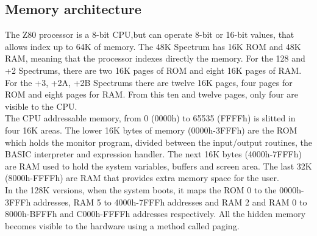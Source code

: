 \subsection{Memory architecture}
The Z80 processor is a 8-bit CPU,but can operate 8-bit or 16-bit values, that allows index up to 64K of memory. The 48K Spectrum has 16K ROM and 48K RAM, meaning that the processor indexes directly  the memory. For the 128 and +2 Spectrums, there are two 16K pages of ROM and eight 16K pages of RAM. For the +3, +2A, +2B Spectrums there are twelve 16K pages, four pages for ROM and eight pages for RAM. From this ten and twelve pages, only four are visible to the CPU.\\
\indent The CPU addressable memory, from 0 (0000h) to 65535 (FFFFh) is slitted in four 16K areas. The lower 16K bytes of memory (0000h-3FFFh) are the ROM which holds the monitor program, divided between the input/output routines, the BASIC interpreter and expression handler. The next 16K bytes (4000h-7FFFh) are RAM used to hold the system variables, buffers and screen area. The last 32K (8000h-FFFFh) are RAM that provides extra memory space for the user.\\
\indent In the 128K versions, when the system boots, it maps the ROM 0 to the 0000h-3FFFh addresses, RAM 5 to 4000h-7FFFh addresses and RAM 2 and RAM 0 to 8000h-BFFFh and C000h-FFFFh addresses respectively. All the hidden memory becomes visible to the hardware using a method called paging.

